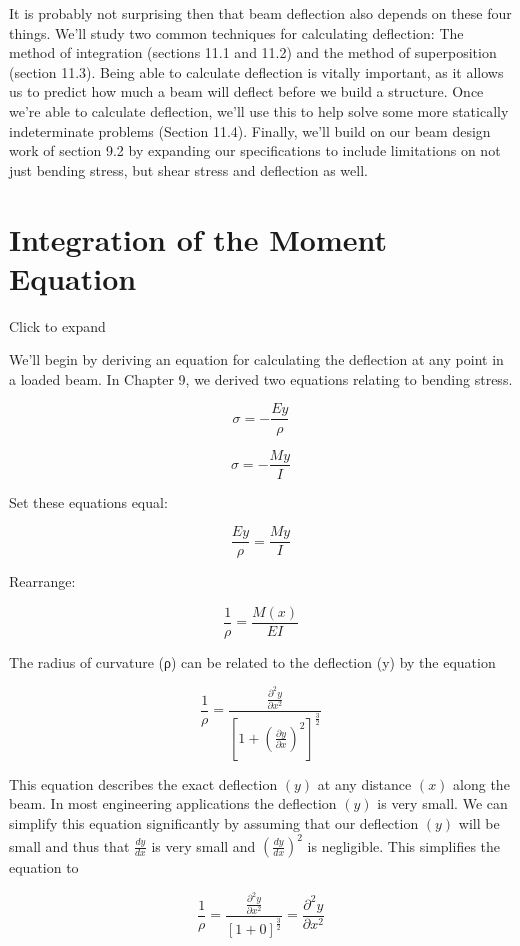 \documentclass[
  letterpaper,
  DIV=11,
  numbers=noendperiod]{scrreprt}
\begin{document}
It is probably not surprising then that beam deflection also depends on
these four things. We'll study two common techniques for calculating
deflection: The method of integration (sections 11.1 and 11.2) and the
method of superposition (section 11.3). Being able to calculate
deflection is vitally important, as it allows us to predict how much a
beam will deflect before we build a structure. Once we're able to
calculate deflection, we'll use this to help solve some more statically
indeterminate problems (Section 11.4). Finally, we'll build on our beam
design work of section 9.2 by expanding our specifications to include
limitations on not just bending stress, but shear stress and deflection
as well.

\section{Integration of the Moment
Equation}\label{integration-of-the-moment-equation}

Click to expand

We'll begin by deriving an equation for calculating the deflection at
any point in a loaded beam. In Chapter 9, we derived two equations
relating to bending stress.

\[
\sigma=-\frac{E y}{\rho}
\]

\[
\sigma=-\frac{M y}{I}
\]

Set these equations equal:

\[
\frac{E y}{\rho}=\frac{M y}{I}
\]

Rearrange:

\[
\frac{1}{\rho}=\frac{M(x)}{E I}
\]

The radius of curvature (ρ) can be related to the deflection (y) by the
equation

\[
\frac{1}{\rho}=\frac{\frac{\partial^{2} y}{\partial x^{2}}}{\left[1+\left(\frac{\partial y}{\partial x}\right)^{2}\right]^{\frac{3}{2}}}
\]

This equation describes the exact deflection \((y)\) at any distance
\((x)\) along the beam. In most engineering applications the deflection
\((y)\) is very small. We can simplify this equation significantly by
assuming that our deflection \((y)\) will be small and thus that
\(\frac{d y}{d x}\) is very small and
\(\left(\frac{d y}{d x}\right)^{2}\) is negligible. This simplifies the
equation to

\[
\frac{1}{\rho}=\frac{\frac{\partial^{2} y}{\partial x^{2}}}{[1+0]^{\frac{3}{2}}}=\frac{\partial^{2} y}{\partial x^{2}}
\]
\end{document}
